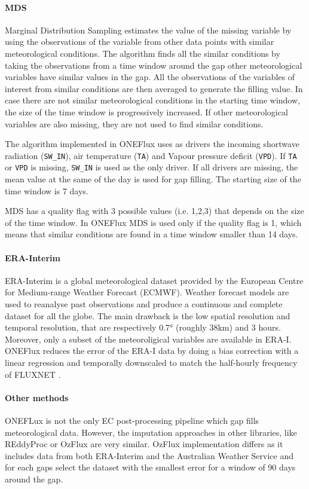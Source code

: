 \documentclass{article}
\begin{document}
\paragraph{MDS} Marginal Distribution Sampling \cite{reichstein_separation_2005-3} estimates the value of the missing variable by using the observations of the variable from other data points with similar meteorological conditions.
The algorithm finds all the similar conditions by taking the observations from a time window around the gap other meteorological variables have similar values in the gap.
All the observations of the variables of interest from similar conditions are then averaged to generate the filling value.
In case there are not similar meteorological conditions in the starting time window, the size of the time window is progressively increased. If other meteorological variables are also missing, they are not used to find similar conditions.

The algorithm implemented in ONEFlux uses as drivers the incoming shortwave radiation (\texttt{SW\_IN}), air temperature (\texttt{TA}) and Vapour pressure deficit (\texttt{VPD}). If \texttt{TA} or \texttt{VPD} is missing, \texttt{SW\_IN} is used as the only driver. If all drivers are missing, the mean value at the same of the day is used for gap filling. The starting size of the time window is 7 days.

MDS has a quality flag with 3 possible values (i.e. 1,2,3) that depends on the size of the time window. In ONEFlux MDS is used only if the quality flag is 1, which means that similar conditions are found in a time window smaller than 14 days.

\paragraph{ERA-Interim} ERA-Interim is a global meteorological dataset provided by the European Centre for Medium-range Weather Forecast (ECMWF). Weather forecast models are used to reanalyse past observations and produce a continuous and complete dataset for all the globe. The main drawback is the low spatial resolution and temporal resolution, that are respectively 0.7° (roughly 38\si{km}) and 3 hours. Moreover, only a subset of the meteoroligical variables are available in ERA-I. ONEFlux reduces the error of the ERA-I data by doing a bias correction with a linear regression and temporally downscaled to match the half-hourly frequency of FLUXNET \cite{vuichard_filling_2015}. 


\paragraph{Other methods} ONEFLux is not the only EC post-processing pipeline which gap fills meteorological data. However, the imputation approaches in other libraries, like REddyProc \cite{wutzler_basic_2018} or OzFlux \cite{isaac_ozflux_2017} are very similar. OzFlux implementation differs as it includes data from both ERA-Interim and the Australian Weather Service and for each gaps select the dataset with the smallest error for a window of 90 days around the gap.
\pagebreak
\end{document}
